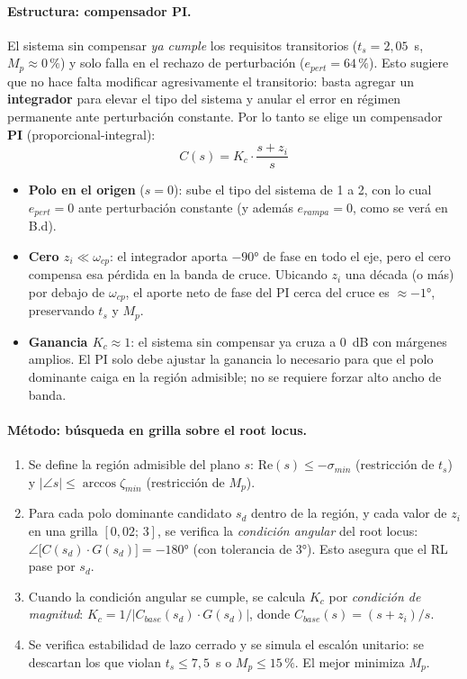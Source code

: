\documentclass[12pt, a4paper]{article}
\begin{document}
\paragraph{Estructura: compensador PI.}
El sistema sin compensar \emph{ya cumple} los requisitos transitorios ($t_s = 2{,}05$~s, $M_p \approx 0\,\%$) y solo falla en el rechazo de perturbación ($e_{pert} = 64\,\%$). Esto sugiere que no hace falta modificar agresivamente el transitorio: basta agregar un \textbf{integrador} para elevar el tipo del sistema y anular el error en régimen permanente ante perturbación constante. Por lo tanto se elige un compensador \textbf{PI} (proporcional-integral):
%
\begin{equation}
    C(s) = K_c \cdot \frac{s + z_i}{s}
    \label{eq:CPI}
\end{equation}
%
\begin{itemize}
    \item \textbf{Polo en el origen} ($s = 0$): sube el tipo del sistema de 1 a 2, con lo cual $e_{pert} = 0$ ante perturbación constante (y además $e_{rampa} = 0$, como se verá en B.d).
    \item \textbf{Cero $z_i \ll \omega_{cp}$}: el integrador aporta $-90°$ de fase en todo el eje, pero el cero compensa esa pérdida en la banda de cruce. Ubicando $z_i$ una década (o más) por debajo de $\omega_{cp}$, el aporte neto de fase del PI cerca del cruce es $\approx -1°$, preservando $t_s$ y $M_p$.
    \item \textbf{Ganancia $K_c \approx 1$}: el sistema sin compensar ya cruza a 0~dB con márgenes amplios. El PI solo debe ajustar la ganancia lo necesario para que el polo dominante caiga en la región admisible; no se requiere forzar alto ancho de banda.
\end{itemize}

\paragraph{Método: búsqueda en grilla sobre el root locus.}
\begin{enumerate}
    \item Se define la región admisible del plano $s$: $\text{Re}(s) \leq -\sigma_{min}$ (restricción de $t_s$) y $|{\angle s}| \leq \arccos\zeta_{min}$ (restricción de $M_p$).
    \item Para cada polo dominante candidato $s_d$ dentro de la región, y cada valor de $z_i$ en una grilla $[0{,}02;\,3]$, se verifica la \emph{condición angular} del root locus: $\angle\bigl[C(s_d)\cdot G(s_d)\bigr] = -180°$ (con tolerancia de $3°$). Esto asegura que el RL pase por $s_d$.
    \item Cuando la condición angular se cumple, se calcula $K_c$ por \emph{condición de magnitud}: $K_c = 1/|C_{base}(s_d)\cdot G(s_d)|$, donde $C_{base}(s) = (s+z_i)/s$.
    \item Se verifica estabilidad de lazo cerrado y se simula el escalón unitario: se descartan los que violan $t_s \leq 7{,}5$~s o $M_p \leq 15\,\%$. El mejor minimiza $M_p$.
\end{enumerate}
\end{document}
